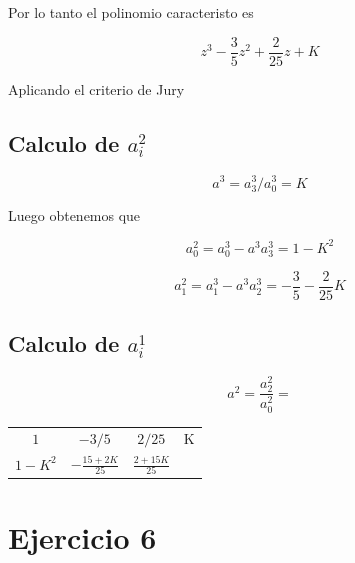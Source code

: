 \documentclass{article}
\begin{document}
        Por lo tanto el polinomio caracteristo es 

        \begin{equation}
            z^3 - \frac{3}{5} z^2 + \frac{2}{25} z + K
        \end{equation}

        Aplicando el criterio de Jury 

        \subsection{Calculo de $a^2_i$}

            \begin{equation}
                a^3 = a^3_3 / a^3_0 = K
            \end{equation}

            Luego obtenemos que 

            \begin{equation}
                a^2_0 = a^3_0 - a^3a^3_3 = 1 - K^2
            \end{equation}

            \begin{equation}
                a^2_1 = a^3_1 - a^3a^3_2 = -\frac{3}{5} - \frac{2}{25} K 
            \end{equation}

           

        \subsection{Calculo de $a^1_i$}

            \begin{equation}
                a^2 = \frac{a^2_2}{a^2_0} = 
            \end{equation}

        \begin{table}
            \centering
            \begin{tabular}{|c|c|c|c|} 
                $1$ & $-3/5$ & $2/25$ & K \\
                $1-K^2$ & $-\frac{15+2K}{25}$ & $\frac{2+15K}{25}$ \\
                
            \end{tabular}
        \end{table}

        \section{Ejercicio 6}
\end{document}
